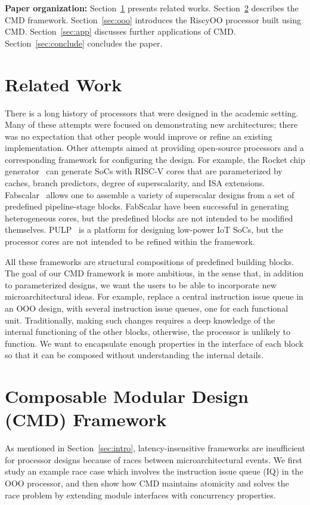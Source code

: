 \documentclass[conference]{IEEEtran}
\begin{document}
\noindent\textbf{Paper organization:}
Section~\ref{sec:related} presents related works.
Section~\ref{sec:cmd} describes the CMD framework.
Section~\ref{sec:ooo} introduces the RiscyOO processor built using CMD.
Section~\ref{sec:app} discusses further applications of CMD.
Section~\ref{sec:conclude} concludes the paper.

\section{Related Work}\label{sec:related}
There is a long history of processors that were designed in the academic setting.
Many of these attempts were focused on demonstrating new architectures; there was no expectation that other people would improve or refine an existing implementation.
Other attempts aimed at providing open-source processors and a corresponding framework for configuring the design.
For example, the Rocket chip generator~\cite{rocketchip} can generate SoCs with RISC-V cores that are parameterized by caches, branch predictors, degree of superscalarity, and ISA extensions.
Fabscalar~\cite{fabscalar} allows one to assemble a variety of superscalar designs from a set of predefined pipeline-stage blocks.
FabScalar have been successful in generating heterogeneous cores, but the predefined blocks are not intended to be modified themselves.
PULP~\cite{pulp} is a platform for designing low-power IoT SoCs, but the processor cores are not intended to be refined within the framework.

All these frameworks are structural compositions of predefined building blocks.
The goal of our CMD framework is more ambitious, in the sense that, in addition to parameterized designs, we want the users to be able to incorporate new microarchitectural ideas.
For example, replace a central instruction issue queue in an OOO design, with several instruction issue queues, one for each functional unit.
Traditionally, making such changes requires a deep knowledge of the internal functioning of the other blocks, otherwise, the processor is unlikely to function. 
We want to encapsulate enough properties in the interface of each block so that it can be composed without understanding the internal details.

\section{Composable Modular Design (CMD) Framework}\label{sec:cmd}

As mentioned in Section~\ref{sec:intro}, latency-insensitive frameworks are insufficient for processor designs because of races between microarchitectural events.
We first study an example race case which involves the instruction issue queue (IQ) in the OOO processor, and then show how CMD maintains atomicity and solves the race problem by extending module interfaces with concurrency properties.
\end{document}
